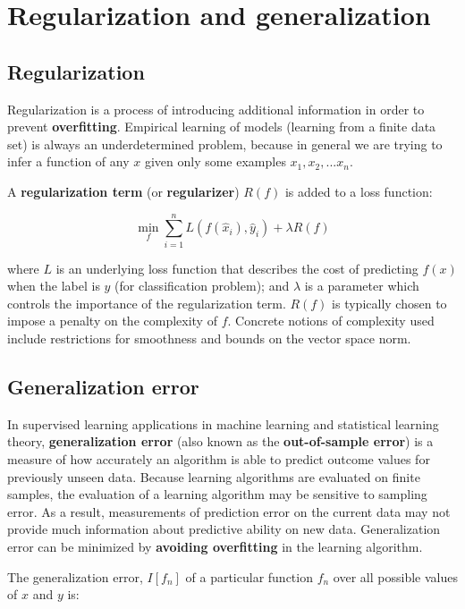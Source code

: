     \section{Regularization and generalization}
    \subsection{Regularization}
    Regularization is a process of introducing additional information in order to prevent \textbf{overfitting}. Empirical learning of models (learning from a finite data set) is always an underdetermined problem, because in general we are trying to infer a function of any $x$ given only some examples $ x_{1},x_{2},...x_{n}$.

    A \textbf{regularization term} (or \textbf{regularizer}) $R(f)$ is added to a loss function:

    \begin{equation}
        \min _{f}\sum _{i=1}^{n}L(f({\hat {x}}_{i}),{\hat {y}}_{i})+\lambda R(f)
    \end{equation}

    where $L$ is an underlying loss function that describes the cost of predicting $ f(x)$ when the label is $y$ (for classification problem); and $\lambda$  is a parameter which controls the importance of the regularization term. $ R(f)$ is typically chosen to impose a penalty on the complexity of $f$. Concrete notions of complexity used include restrictions for smoothness and bounds on the vector space norm.

    \subsection{Generalization error}
    In supervised learning applications in machine learning and statistical learning theory, \textbf{generalization error} (also known as the \textbf{out-of-sample error}) is a measure of how accurately an algorithm is able to predict outcome values for previously unseen data. Because learning algorithms are evaluated on finite samples, the evaluation of a learning algorithm may be sensitive to sampling error. As a result, measurements of prediction error on the current data may not provide much information about predictive ability on new data. Generalization error can be minimized by \textbf{avoiding overfitting} in the learning algorithm.

    The generalization error, $I[f_{n}]$ of a particular function $f_{n}$ over all possible values of $x$ and $y$ is:

